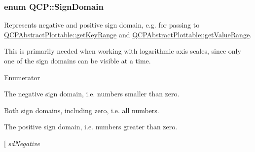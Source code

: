 \subsubsection[{\texorpdfstring{Sign\+Domain}{SignDomain}}]{\setlength{\rightskip}{0pt plus 5cm}enum {\bf Q\+C\+P\+::\+Sign\+Domain}}\hypertarget{namespace_q_c_p_afd50e7cf431af385614987d8553ff8a9}{}\label{namespace_q_c_p_afd50e7cf431af385614987d8553ff8a9}
Represents negative and positive sign domain, e.\+g. for passing to \hyperlink{class_q_c_p_abstract_plottable_a4da16d3cd4b509e1104a9b0275623c96}{Q\+C\+P\+Abstract\+Plottable\+::get\+Key\+Range} and \hyperlink{class_q_c_p_abstract_plottable_a4de773988b21ed090fddd27c6a3a3dcb}{Q\+C\+P\+Abstract\+Plottable\+::get\+Value\+Range}.

This is primarily needed when working with logarithmic axis scales, since only one of the sign domains can be visible at a time. \begin{Desc}
\item[Enumerator]\par
\begin{description}
\item[{\em 
sd\+Negative\hypertarget{namespace_q_c_p_afd50e7cf431af385614987d8553ff8a9a0b464fa3135be2808909739a969193c9}{}\label{namespace_q_c_p_afd50e7cf431af385614987d8553ff8a9a0b464fa3135be2808909739a969193c9}
}]The negative sign domain, i.\+e. numbers smaller than zero. \item[{\em 
sd\+Both\hypertarget{namespace_q_c_p_afd50e7cf431af385614987d8553ff8a9a3dee7e9cd2fedce9253b83e172626a6c}{}\label{namespace_q_c_p_afd50e7cf431af385614987d8553ff8a9a3dee7e9cd2fedce9253b83e172626a6c}
}]Both sign domains, including zero, i.\+e. all numbers. \item[{\em 
sd\+Positive\hypertarget{namespace_q_c_p_afd50e7cf431af385614987d8553ff8a9a23362334a52289677a51526a9b68db6c}{}\label{namespace_q_c_p_afd50e7cf431af385614987d8553ff8a9a23362334a52289677a51526a9b68db6c}
}]The positive sign domain, i.\+e. numbers greater than zero. \item[{\em 
sd\+Negative\hypertarget{namespace_q_c_p_afd50e7cf431af385614987d8553ff8a9a0b464fa3135be2808909739a969193c9}{}\label{namespace_q_c_p_afd50e7cf431af385614987d8553ff8a9a0b464fa3135be2808909739a969193c9}
}
\end{description}
\end{Desc}
